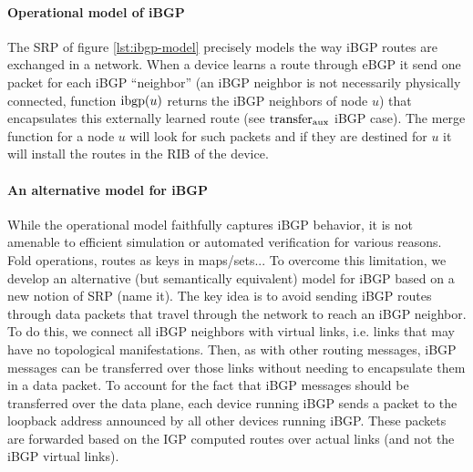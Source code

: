 \documentclass[sigconf,10pt]{acmart}
\begin{document}
\paragraph{Operational model of iBGP}
The SRP of figure \ref{lst:ibgp-model} precisely models the way iBGP
routes are exchanged in a network. When a device learns a route
through eBGP it send one packet for each iBGP ``neighbor'' (an iBGP
neighbor is not necessarily physically connected, function $\mathrm{ibgp}(u)$
returns the iBGP neighbors of node $u$) that encapsulates this
externally learned route (see $\mathrm{transfer}_{\mathrm{aux}}$ iBGP case). The merge
function for a node $u$ will look for such packets and if they are
destined for $u$ it will install the routes in the RIB of the device.

\paragraph{An alternative model for iBGP}

While the operational model faithfully captures iBGP behavior, it is
not amenable to efficient simulation or automated verification for
various reasons. Fold operations, routes as keys in maps/sets... To
overcome this limitation, we develop an alternative (but semantically
equivalent) model for iBGP based on a new notion of SRP (name it). The
key idea is to avoid sending iBGP routes through data packets that
travel through the network to reach an iBGP neighbor. To do this, we
connect all iBGP neighbors with virtual links, i.e. links that may
have no topological manifestations. Then, as with other routing
messages, iBGP messages can be transferred over those links without
needing to encapsulate them in a data packet. To account for the fact
that iBGP messages should be transferred over the data plane, each
device running iBGP sends a packet to the loopback address announced
by all other devices running iBGP. These packets are forwarded based
on the IGP computed routes over actual links (and not the iBGP virtual
links).
\end{document}
